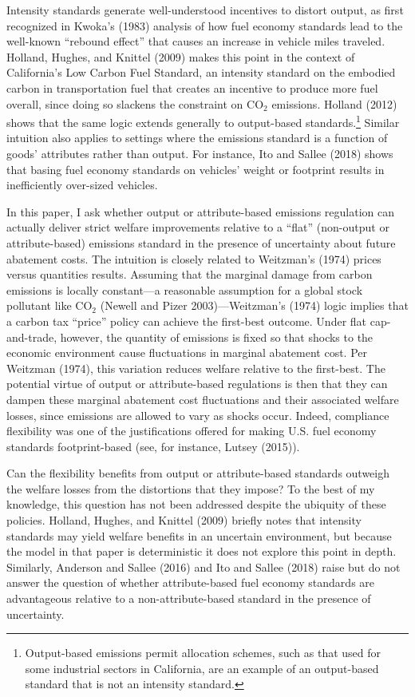 \documentclass[12pt]{article}
\begin{document}
Intensity standards generate well-understood incentives to distort output, as first recognized in Kwoka's (1983) analysis of how fuel economy standards lead to the well-known ``rebound effect'' that causes an increase in vehicle miles traveled. Holland, Hughes, and Knittel (2009) makes this point in the context of California's Low Carbon Fuel Standard, an intensity standard on the embodied carbon in transportation fuel that creates an incentive to produce more fuel overall, since doing so slackens the constraint on CO$_{\text{2}}$ emissions. Holland (2012) shows that the same logic extends generally to output-based standards.\footnote{Output-based emissions permit allocation schemes, such as that used for some industrial sectors in California, are an example of an output-based standard that is not an intensity standard.} Similar intuition also applies to settings where the emissions standard is a function of goods' attributes rather than output. For instance, Ito and Sallee (2018) shows that basing fuel economy standards on vehicles' weight or footprint results in inefficiently over-sized vehicles.

In this paper, I ask whether output or attribute-based emissions regulation can actually deliver strict welfare improvements relative to a ``flat'' (non-output or attribute-based) emissions standard in the presence of uncertainty about future abatement costs. The intuition is closely related to Weitzman's (1974) prices versus quantities results. Assuming that the marginal damage from carbon emissions is locally constant---a reasonable assumption for a global stock pollutant like CO$_{\text{2}}$ (Newell and Pizer 2003)---Weitzman's (1974) logic implies that a carbon tax ``price'' policy can achieve the first-best outcome. Under flat cap-and-trade, however, the quantity of emissions is fixed so that shocks to the economic environment cause fluctuations in marginal abatement cost. Per Weitzman (1974), this variation reduces welfare relative to the first-best. The potential virtue of output or attribute-based regulations is then that they can dampen these marginal abatement cost fluctuations and their associated welfare losses, since emissions are allowed to vary as shocks occur. Indeed, compliance flexibility was one of the justifications offered for making U.S. fuel economy standards footprint-based (see, for instance, Lutsey (2015)).

Can the flexibility benefits from output or attribute-based standards outweigh the welfare losses from the distortions that they impose? To the best of my knowledge, this question has not been addressed despite the ubiquity of these policies. Holland, Hughes, and Knittel (2009) briefly notes that intensity standards may yield welfare benefits in an uncertain environment, but because the model in that paper is deterministic it does not explore this point in depth. Similarly, Anderson and Sallee (2016) and Ito and Sallee (2018) raise but do not answer the question of whether attribute-based fuel economy standards are advantageous relative to a non-attribute-based standard in the presence of uncertainty.
\end{document}
